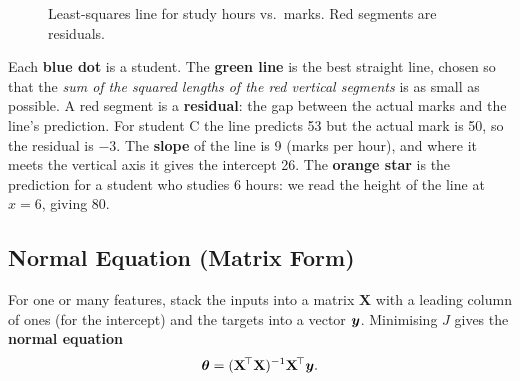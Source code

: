 \begin{figure}[!htbp]
\centering
{}
\caption{Least-squares line for study hours vs.\ marks. Red segments are residuals.}\label{fig:linreg}
\end{figure}

\begin{explain}
Each \textbf{blue dot} is a student. The \textbf{green line} is the best straight line, chosen so that the \emph{sum of the squared lengths of the red vertical segments} is as small as possible. A red segment is a \textbf{residual}: the gap between the actual marks and the line's prediction. For student C the line predicts 53 but the actual mark is 50, so the residual is $-3$. The \textbf{slope} of the line is 9 (marks per hour), and where it meets the vertical axis it gives the intercept 26. The \textbf{orange star} is the prediction for a student who studies 6 hours: we read the height of the line at $x=6$, giving 80.
\end{explain}

\subsection{Normal Equation (Matrix Form)}

For one or many features, stack the inputs into a matrix $\mathbf X$ with a leading column of ones (for the intercept) and the targets into a vector $\boldsymbol{y}$. Minimising $J$ gives the \textbf{normal equation}
\begin{equation}\label{eq:normal}
  \boldsymbol{\theta}=(\mathbf X^{\!\top}\mathbf X)^{-1}\mathbf X^{\!\top}\boldsymbol{y} .
\end{equation}

